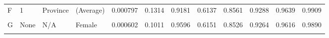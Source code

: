 \documentclass[
]{report}
\begin{document}
\begin{table}[!h]
\begin{tabular}[t]{llllrrrrrrrr}
F & 1 & Province & (Average) & 0.000797 & 0.1314 & 0.9181 & 0.6137 & 0.8561 & 0.9288 & 0.9639 & 0.9909\\
\cellcolor{gray!6}{G} & \cellcolor{gray!6}{None} & \cellcolor{gray!6}{N/A} & \cellcolor{gray!6}{Male} & \cellcolor{gray!6}{0.001010} & \cellcolor{gray!6}{0.1661} & \cellcolor{gray!6}{0.9105} & \cellcolor{gray!6}{0.5995} & \cellcolor{gray!6}{0.8479} & \cellcolor{gray!6}{0.9242} & \cellcolor{gray!6}{0.9610} & \cellcolor{gray!6}{0.9903}\\
G & None & N/A & Female & 0.000602 & 0.1011 & 0.9596 & 0.6151 & 0.8526 & 0.9264 & 0.9616 & 0.9890\\
\addlinespace
\cellcolor{gray!6}{G} & \cellcolor{gray!6}{None} & \cellcolor{gray!6}{N/A} & \cellcolor{gray!6}{(Average)} & \cellcolor{gray!6}{0.000804} & \cellcolor{gray!6}{0.1336} & \cellcolor{gray!6}{0.9350} & \cellcolor{gray!6}{0.6073} & \cellcolor{gray!6}{0.8502} & \cellcolor{gray!6}{0.9253} & \cellcolor{gray!6}{0.9613} & \cellcolor{gray!6}{0.9897}\\
\bottomrule
\end{tabular}
\end{table}
\end{document}

